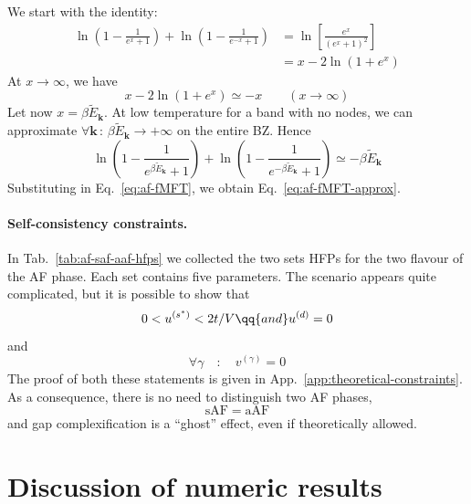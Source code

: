 \begin{tabproof}

	We start with the identity:
	\[
	\begin{aligned}
		\ln(1 - \frac{1}{e^x + 1}) + \ln(1 - \frac{1}{e^{-x} + 1}) &= \ln\left[ \frac{e^x}{(e^x+1)^2} \right] \\
		&= x - 2 \ln(1+e^x)
	\end{aligned}
	\]
	At $x \to \infty$, we have
	\[
		x - 2 \ln(1+e^x) \simeq -x
		\qquad
		(x \to \infty)
	\]
	Let now $x=\beta \tilde{E}_\mathbf{k}$. At low temperature for a band with no nodes, we can approximate $\forall\mathbf{k}\,\colon\,\beta \tilde{E}_\mathbf{k}\to +\infty$ on the entire BZ. Hence
	\[
		\ln(1 - \frac{1}{e^{\beta \tilde{E}_\mathbf{k}} + 1}) + \ln(1 - \frac{1}{e^{-\beta \tilde{E}_\mathbf{k}} + 1}) \simeq -\beta \tilde{E}_\mathbf{k}
	\]
	Substituting in Eq.~\eqref{eq:af-fMFT}, we obtain Eq.~\eqref{eq:af-fMFT-approx}.

\end{tabproof}

\paragraph{Self-consistency constraints.}

In Tab.~\ref{tab:af-saf-aaf-hfps} we collected the two sets HFPs for the two flavour of the AF phase. Each set contains five parameters. The scenario appears quite complicated, but it is possible to show that
\begin{equation}\label{eq:af-us*-ud-constraint}
	0 < u^{(s^*)} < 2t/V
	\qq{and}
	u^{(d)} = 0
\end{equation}
and
\begin{equation}\label{eq:af-vgamma-constraint}
	\forall\gamma
	\quad\colon\quad
	v^{(\gamma)} = 0
\end{equation}
The proof of both these statements is given in App.~\ref{app:theoretical-constraints}. As a consequence, there is no need to distinguish two AF phases,
\[
\mathrm{sAF} = \mathrm{aAF}
\]
and gap complexification is a ``ghost'' effect, even if theoretically allowed. 

\section{Discussion of numeric results}\label{sec:af-numeric}


